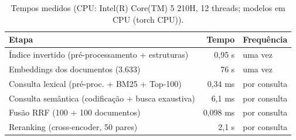 \begin{table}[t]
\centering
\caption{Tempos medidos (CPU: Intel(R) Core(TM) 5 210H, 12 threads; modelos em CPU (torch CPU)).}
\label{tab:times}
\small
\begin{tabular}{lrl}
\toprule
Etapa & Tempo & Frequência \\
\midrule
Índice invertido (pré-processamento + estruturas) & 0,95 s & uma vez \\
Embeddings dos documentos (3.633) & 76 s & uma vez \\
Consulta lexical (pré-proc. + BM25 + Top-100) & 0,34 ms & por consulta \\
Consulta semântica (codificação + busca exaustiva) & 6,1 ms & por consulta \\
Fusão RRF (100 + 100 documentos) & 0,098 ms & por consulta \\
Reranking (cross-encoder, 50 pares) & 2,1 s & por consulta \\
\bottomrule
\end{tabular}
\end{table}
